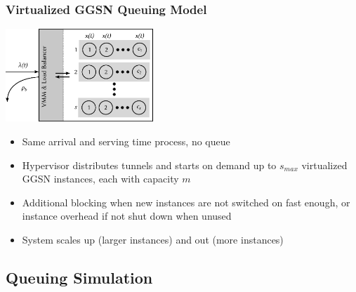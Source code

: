 \documentclass{beamer}
\begin{document}
\begin{frame}
	\frametitle{Virtualized GGSN Queuing Model}
		\begin{center}
			\includegraphics[height=3.5cm]{../../chapters/04-mobilenets/images/ggsn-virtualized.pdf}
		\end{center}

		\begin{itemize}
			\item Same arrival and serving time process, no queue
			\item Hypervisor distributes tunnels and starts on demand up to $s_{max}$ virtualized GGSN instances, each with capacity $m$
			\item Additional blocking when new instances are not switched on fast enough, or instance overhead if not shut down when unused
			\item System scales up (larger instances) and out (more instances)
		\end{itemize}
\end{frame}


\subsection{Queuing Simulation}
\end{document}
